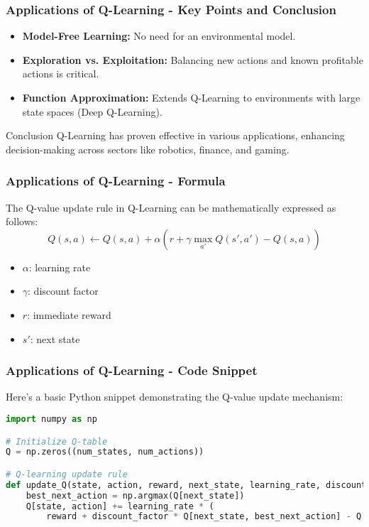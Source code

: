 \documentclass[aspectratio=169]{beamer}
\begin{document}
\begin{frame}[fragile]
    \frametitle{Applications of Q-Learning - Key Points and Conclusion}
    \begin{itemize}
        \item \textbf{Model-Free Learning:} No need for an environmental model.
        \item \textbf{Exploration vs. Exploitation:} Balancing new actions and known profitable actions is critical.
        \item \textbf{Function Approximation:} Extends Q-Learning to environments with large state spaces (Deep Q-Learning).
    \end{itemize}

    \begin{block}{Conclusion}
        Q-Learning has proven effective in various applications, enhancing decision-making across sectors like robotics, finance, and gaming.
    \end{block}
\end{frame}

\begin{frame}[fragile]
    \frametitle{Applications of Q-Learning - Formula}
    The Q-value update rule in Q-Learning can be mathematically expressed as follows:
    \begin{equation}
        Q(s, a) \leftarrow Q(s, a) + \alpha \left( r + \gamma \max_{a'} Q(s', a') - Q(s, a) \right)
    \end{equation}
    \begin{itemize}
        \item \(\alpha\): learning rate
        \item \(\gamma\): discount factor
        \item \(r\): immediate reward
        \item \(s'\): next state
    \end{itemize}
\end{frame}

\begin{frame}[fragile]
    \frametitle{Applications of Q-Learning - Code Snippet}
    Here’s a basic Python snippet demonstrating the Q-value update mechanism:
    \begin{lstlisting}[language=Python]
import numpy as np

# Initialize Q-table
Q = np.zeros((num_states, num_actions))

# Q-learning update rule
def update_Q(state, action, reward, next_state, learning_rate, discount_factor):
    best_next_action = np.argmax(Q[next_state])
    Q[state, action] += learning_rate * (
        reward + discount_factor * Q[next_state, best_next_action] - Q[state, action])
    \end{lstlisting}
\end{frame}
\end{document}
